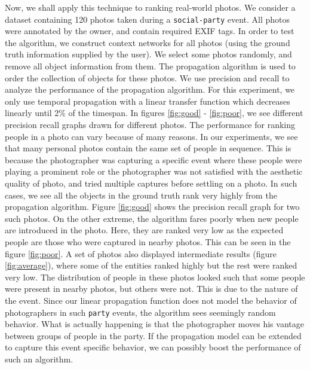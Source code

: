 Now, we shall apply this technique to ranking real-world photos. We consider a dataset containing 120 photos taken during a \texttt{social-party} event. All photos were annotated by the owner, and contain required EXIF tags. In order to test the algorithm, we construct context networks for all photos (using the ground truth information supplied by the user). We select some photos randomly, and remove all object information from them. The propagation algorithm is used to order the collection of objects for these photos. We use precision and recall to analyze the performance of the propagation algorithm. For this experiment, we only use temporal propagation with a linear transfer function which decreases linearly until 2\% of the timespan. In figures \ref{fig:good} - \ref{fig:poor}, we see different precision recall graphs drawn for different photos. The performance for ranking people in a photo can vary because of many reasons. In our experiments, we see that many personal photos contain the same set of people in sequence. This is because the photographer was capturing a specific event where these people were playing a prominent role or the photographer was not satisfied with the aesthetic quality of photo, and tried multiple captures before settling on a photo. In such cases, we see all the objects in the ground truth rank very highly from the propagation algorithm. Figure \ref{fig:good} shows the precision recall graph for two such photos. On the other extreme, the algorithm fares poorly when new people are introduced in the photo. Here, they are ranked very low as the expected people are those who were captured in nearby photos. This can be seen in the figure \ref{fig:poor}. A set of photos also displayed intermediate results (figure \ref{fig:average}), where some of the entities ranked highly but the rest were ranked very low. The distribution of people in these photos looked such that some people were present in nearby photos, but others were not. This is due to the nature of the event. Since our linear propagation function does not model the behavior of photographers in such \texttt{party} events, the algorithm sees seemingly random behavior. What is actually happening is that the photographer moves his vantage between groups of people in the party. If the propagation model can be extended to capture this event specific behavior, we can possibly boost the performance of such an algorithm. 

